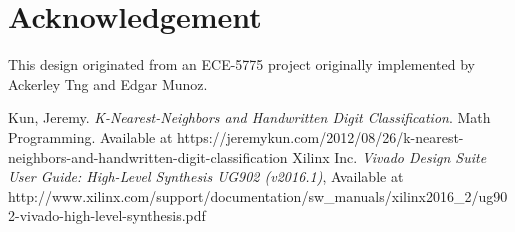 \documentclass[paper=letter, fontsize=10pt]{scrartcl} %
\numberwithin{equation}{section} %
\numberwithin{figure}{section} %
\numberwithin{table}{section} %
\begin{document}

\section{Acknowledgement}
This design originated from an ECE-5775 project originally implemented by Ackerley Tng and Edgar Munoz. 


\begin{thebibliography}{3}

Kun, Jeremy. \emph{K-Nearest-Neighbors and Handwritten Digit Classification}. Math Programming. Available at https://jeremykun.com/2012/08/26/k-nearest-neighbors-and-handwritten-digit-classification
Xilinx Inc. \emph{Vivado Design Suite User Guide: High-Level Synthesis UG902 (v2016.1)},
Available at http://www.xilinx.com/support/documentation/sw\_manuals/xilinx2016\_2/ug902-vivado-high-level-synthesis.pdf

\end{thebibliography}
\end{document}
